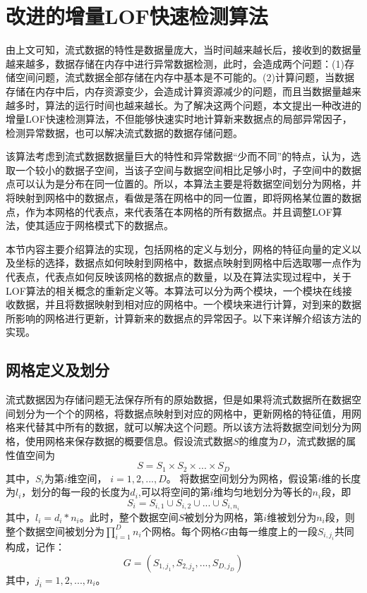 \section{改进的增量LOF快速检测算法}
由上文可知，流式数据的特性是数据量庞大，当时间越来越长后，接收到的数据量越来越多，数据存储在内存中进行异常数据检测，此时，会造成两个问题：(1)存储空间问题，流式数据全部存储在内存中基本是不可能的。(2)计算问题，当数据存储在内存中后，内存资源变少，会造成计算资源减少的问题，而且当数据量越来越多时，算法的运行时间也越来越长。为了解决这两个问题，本文提出一种改进的增量LOF快速检测算法，不但能够快速实时地计算新来数据点的局部异常因子，检测异常数据，也可以解决流式数据的数据存储问题。

该算法考虑到流式数据数据量巨大的特性和异常数据“少而不同”的特点，认为，选取一个较小的数据子空间，当该子空间与数据空间相比足够小时，子空间中的数据点可以认为是分布在同一位置的。所以，本算法主要是将数据空间划分为网格，并将映射到网格中的数据点，看做是落在网格中的同一位置，即将网格某位置的数据点，作为本网格的代表点，来代表落在本网格的所有数据点。并且调整LOF算法，使其适应于网格模式下的数据点。

本节内容主要介绍算法的实现，包括网格的定义与划分，网格的特征向量的定义以及坐标的选择，数据点如何映射到网格中，数据点映射到网格中后选取哪一点作为代表点，代表点如何反映该网格的数据点的数量，以及在算法实现过程中，关于LOF算法的相关概念的重新定义等。本算法可以分为两个模块，一个模块在线接收数据，并且将数据映射到相对应的网格中。一个模块来进行计算，对到来的数据所影响的网格进行更新，计算新来的数据点的异常因子。以下来详解介绍该方法的实现。
\subsection{网格定义及划分}
流式数据因为存储问题无法保存所有的原始数据，但是如果将流式数据所在数据空间划分为一个个的网格，将数据点映射到对应的网格中，更新网格的特征值，用网格来代替其中所有的数据，就可以解决这个问题。所以该方法将数据空间划分为网格，使用网格来保存数据的概要信息。假设流式数据$S$的维度为$D$，流式数据的属性值空间为
\begin{equation}
S = S_1\times S_2 \times ... \times S_D
\end{equation}
其中，$S_i$为第$i$维空间， $i = 1, 2, ..., D$。
将数据空间划分为网格，假设第$i$维的长度为$l_i$，划分的每一段的长度为$d_i$,可以将空间的第$i$维均匀地划分为等长的$n_i$段，即
\begin{equation}
S_i = S_{i,1} \cup S_{i,2} \cup ... \cup S_{i, n_i}
\end{equation}
其中，$l_i = d_i * n_i$。此时，整个数据空间$S$被划分为网格，第$i$维被划分为$n_i$段，则整个数据空间被划分为$\prod_{i=1}^{D}n_i$个网格。每个网格$G$由每一维度上的一段$S_{i, j_i}$共同构成，记作：
\begin{equation}
G = \left ( S_{1,j_1}, S_{2,j_2},...,S_{D,j_D} \right )
\end{equation}
其中，$j_i = 1, 2, ..., n_i$。

